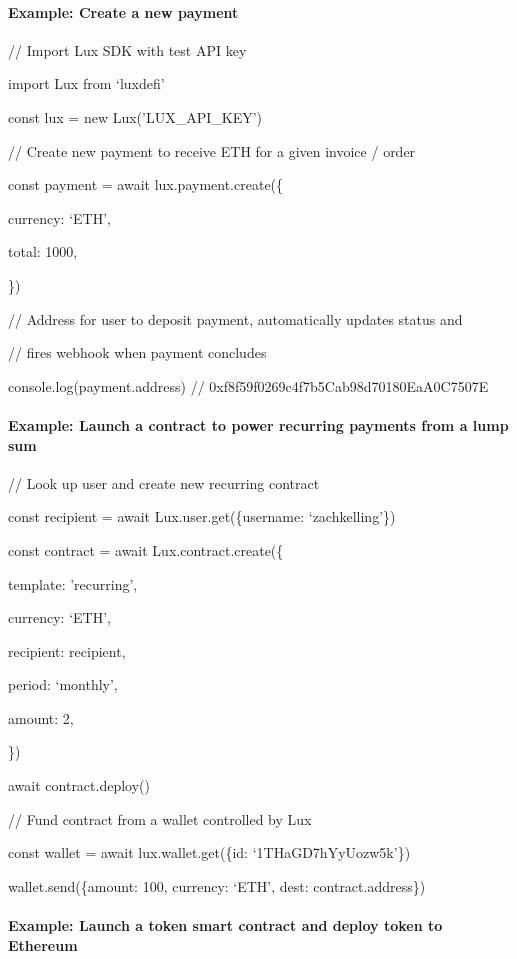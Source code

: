 \documentclass[11pt]{article}
\begin{document}
\paragraph{Example: Create a new payment}

// Import Lux SDK with test API key


import Lux from `luxdefi'


const lux = new Lux('LUX\_API\_KEY')


// Create new payment to receive ETH for a given invoice / order


const payment = await lux.payment.create(\{


currency: `ETH',


total: 	1000,


\})


// Address for user to deposit payment, automatically updates status and


// fires webhook when payment concludes


console.log(payment.address)  // 0xf8f59f0269c4f7b5Cab98d70180EaA0C7507E


\paragraph{Example: Launch a contract to power recurring payments from a lump sum}

// Look up user and create new recurring contract


const recipient = await Lux.user.get(\{username: `zachkelling'\})


const contract = await Lux.contract.create(\{


template: 'recurring',


currency: `ETH',


recipient: recipient,


period: `monthly',


amount: 2,


\})


await contract.deploy()


// Fund contract from a wallet controlled by Lux


const wallet = await lux.wallet.get(\{id: `1THaGD7hYyUozw5k'\})


wallet.send(\{amount: 100, currency: `ETH', dest: contract.address\})


\paragraph{Example: Launch a token smart contract and deploy token to Ethereum}
\end{document}
